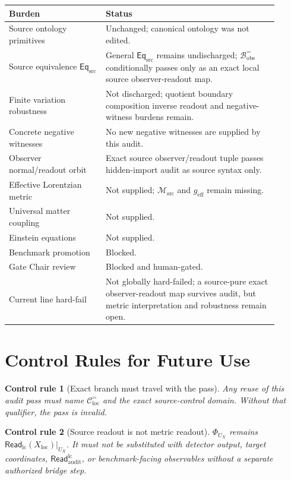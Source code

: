 \documentclass[11pt]{article}
\newcommand{\EqSrc}{\mathsf{Eq}_{\mathrm{src}}}
\newcommand{\ReadLC}{\mathsf{Read}_{\mathrm{lc}}}
\newcommand{\ReadAudit}{\mathsf{Read}_{\mathrm{audit}}^{\mathrm{lc}}}
\newcommand{\Bobs}{\mathcal{B}^{=}_{\mathrm{obs}}}
\newcommand{\Msrc}{\mathcal{M}_{\mathrm{src}}}
\newcommand{\geff}{g_{\mathrm{eff}}}
\newtheorem{controlrule}{Control rule}
\begin{document}
\begin{center}
\small
\begin{tabular}{p{0.32\linewidth}p{0.58\linewidth}}
\hline
Burden & Status \\
\hline
Source ontology primitives & Unchanged; canonical ontology was not edited. \\
Source equivalence \(\EqSrc\) & General \(\EqSrc\) remains undischarged; \(\Bobs\) conditionally passes only as an exact local source observer-readout map. \\
Finite variation robustness & Not discharged; quotient boundary composition inverse readout and negative-witness burdens remain. \\
Concrete negative witnesses & No new negative witnesses are supplied by this audit. \\
Observer normal/readout orbit & Exact source observer/readout tuple passes hidden-import audit as source syntax only. \\
Effective Lorentzian metric & Not supplied; \(\Msrc\) and \(\geff\) remain missing. \\
Universal matter coupling & Not supplied. \\
Einstein equations & Not supplied. \\
Benchmark promotion & Blocked. \\
Gate Chair review & Blocked and human-gated. \\
Current line hard-fail & Not globally hard-failed; a source-pure exact observer-readout map survives audit, but metric interpretation and robustness remain open. \\
\hline
\end{tabular}
\end{center}

\section{Control Rules for Future Use}

\begin{controlrule}[Exact branch must travel with the pass]
Any reuse of this audit pass must name
\(\mathcal{C}^{=}_{\mathrm{loc}}\) and the exact source-control
domain. Without that qualifier, the pass is invalid.
\end{controlrule}

\begin{controlrule}[Source readout is not metric readout]
\(\Phi_{U_X}\) remains \(\ReadLC(X_{\mathrm{loc}})|_{U_X}\). It must
not be substituted with detector output, target coordinates,
\(\ReadAudit\), or benchmark-facing observables without a separate
authorized bridge step.
\end{controlrule}
\end{document}

